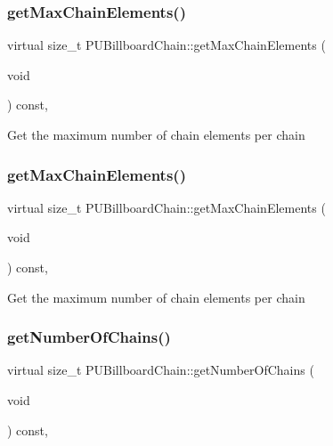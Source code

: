 \subsubsection{\texorpdfstring{get\+Max\+Chain\+Elements()}{getMaxChainElements()}\hspace{0.1cm}{\footnotesize\ttfamily [1/2]}}
{\footnotesize\ttfamily virtual size\+\_\+t P\+U\+Billboard\+Chain\+::get\+Max\+Chain\+Elements (\begin{DoxyParamCaption}\item[{void}]{ }\end{DoxyParamCaption}) const\hspace{0.3cm}{\ttfamily [inline]}, {\ttfamily [virtual]}}

Get the maximum number of chain elements per chain \mbox{\label{classPUBillboardChain_af8944accdd3c6500700e4508feb703e9}} 
\subsubsection{\texorpdfstring{get\+Max\+Chain\+Elements()}{getMaxChainElements()}\hspace{0.1cm}{\footnotesize\ttfamily [2/2]}}
{\footnotesize\ttfamily virtual size\+\_\+t P\+U\+Billboard\+Chain\+::get\+Max\+Chain\+Elements (\begin{DoxyParamCaption}\item[{void}]{ }\end{DoxyParamCaption}) const\hspace{0.3cm}{\ttfamily [inline]}, {\ttfamily [virtual]}}

Get the maximum number of chain elements per chain \mbox{\label{classPUBillboardChain_acd50f9bc6f78acb7138e85f0b0cf1f0f}} 
\subsubsection{\texorpdfstring{get\+Number\+Of\+Chains()}{getNumberOfChains()}\hspace{0.1cm}{\footnotesize\ttfamily [1/2]}}
{\footnotesize\ttfamily virtual size\+\_\+t P\+U\+Billboard\+Chain\+::get\+Number\+Of\+Chains (\begin{DoxyParamCaption}\item[{void}]{ }\end{DoxyParamCaption}) const\hspace{0.3cm}{\ttfamily [inline]}, {\ttfamily [virtual]}}

